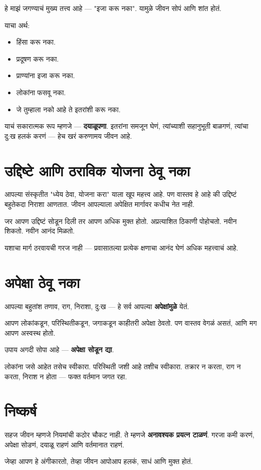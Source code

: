 हे माझं जगण्याचं मुख्य तत्त्व आहे — "इजा करू नका".  
यामुळे जीवन सोपं आणि शांत होतं.  

याचा अर्थ:  
\begin{itemize}
  \item हिंसा करू नका.  
  \item प्रदूषण करू नका.  
  \item प्राण्यांना इजा करू नका.  
  \item लोकांना फसवू नका.  
  \item जे तुम्हाला नको आहे ते इतरांशी करू नका.  
\end{itemize}

याचं सकारात्मक रूप म्हणजे — \textbf{दयाळूपणा}.  
इतरांना समजून घेणं, त्यांच्याशी सहानुभूती बाळगणं, त्यांचा दु:ख हलकं करणं —  
हेच खरं करुणामय जीवन आहे.  

\section{उद्दिष्टे आणि ठराविक योजना ठेवू नका}

आपल्या संस्कृतीत "ध्येय ठेवा, योजना करा" याला खूप महत्त्व आहे.  
पण वास्तव हे आहे की उद्दिष्टं बहुतेकदा निराशा आणतात.  
जीवन आपल्याला अपेक्षित मार्गावर कधीच नेत नाही.  

जर आपण उद्दिष्टं सोडून दिली तर आपण अधिक मुक्त होतो.  
अप्रत्याशित ठिकाणी पोहोचतो.  
नवीन शिकतो.  
नवीन आनंद मिळतो.  

यशाचा मार्ग ठरवायची गरज नाही —  
प्रवासातल्या प्रत्येक क्षणाचा आनंद घेणं अधिक महत्त्वाचं आहे.  

\section{अपेक्षा ठेवू नका}

आपल्या बहुतांश तणाव, राग, निराशा, दु:ख —  
हे सर्व आपल्या \textbf{अपेक्षांमुळे} येतं.  

आपण लोकांकडून, परिस्थितीकडून, जगाकडून काहीतरी अपेक्षा ठेवतो.  
पण वास्तव वेगळं असतं, आणि मग आपण अस्वस्थ होतो.  

उपाय अगदी सोपा आहे —  
\textbf{अपेक्षा सोडून द्या}.  

लोकांना जसे आहेत तसेच स्वीकारा.  
परिस्थिती जशी आहे तशीच स्वीकारा.  
तक्रार न करता, राग न करता, निराश न होता —  
फक्त वर्तमान जगत रहा.  

\section*{निष्कर्ष}

सहज जीवन म्हणजे नियमांची कठोर चौकट नाही.  
ते म्हणजे \textbf{अनावश्यक प्रयत्न टाळणं}.  
गरजा कमी करणं, अपेक्षा सोडणं, दयाळू राहणं आणि वर्तमानात राहणं.  

जेव्हा आपण हे अंगीकारतो, तेव्हा जीवन आपोआप हलकं, साधं आणि मुक्त होतं.  
